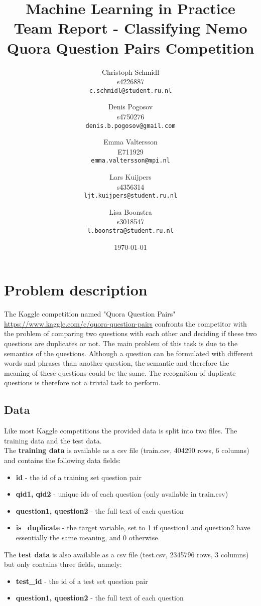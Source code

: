 \documentclass[a4paper]{article}
\title{Machine Learning in Practice\\ \vspace{1em}Team Report - Classifying Nemo\\Quora Question Pairs Competition\vspace{1em}}
\author{
  Christoph Schmidl\\ s4226887\\      \texttt{c.schmidl@student.ru.nl}
  \and
  Denis Pogosov\\ s4750276\\     \texttt{denis.b.pogosov@gmail.com}
  \and
  Emma Valtersson\\	E711929\\	\texttt{emma.valtersson@mpi.nl}
  \and
  Lars Kuijpers\\ s4356314\\ 		\texttt{ljt.kuijpers@student.ru.nl}
  \and
  Lisa Boonstra\\ s3018547\\		\texttt{l.boonstra@student.ru.nl}
}
\date{\today}
\begin{document}
\maketitle


\section{Problem description}

The Kaggle competition named "Quora Question Pairs" \url{https://www.kaggle.com/c/quora-question-pairs} confronts the competitor with the problem of comparing two questions with each other and deciding if these two questions are duplicates or not. The main problem of this task is due to the semantics of the questions. Although a question can be formulated with different words and phrases than another question, the semantic and therefore the meaning of these questions could be the same. The recognition of duplicate questions is therefore not a trivial task to perform.\\

\subsection{Data}
 
Like most Kaggle competitions the provided data is split into two files. The training data and the test data.\\
The \textbf{training data} is available as a csv file (train.csv, 404290 rows, 6 columns) and contains the following data fields:

\begin{itemize}
	\item \textbf{id} - the id of a training set question pair
	\item \textbf{qid1, qid2} - unique ids of each question (only available in train.csv)
	\item \textbf{question1, question2} - the full text of each question
	\item \textbf{is\_duplicate} - the target variable, set to 1 if question1 and question2 have essentially the same meaning, and 0 otherwise. 
\end{itemize}

\noindent The \textbf{test data} is also available as a csv file (test.csv, 2345796 rows, 3 columns) but only contains three fields, namely:

\begin{itemize}
	\item \textbf{test\_id} - the id of a test set question pair
	\item \textbf{question1, question2} - the full text of each question
\end{itemize}
\end{document}
